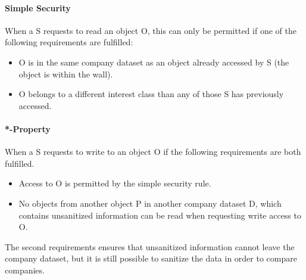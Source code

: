 \paragraph{Simple Security}

When a \principal{} S requests to read an object O, this can only be permitted if one of the following requirements are fulfilled:

\begin{itemize}
\item O is in the same company dataset as an object already accessed by S (the object is within the wall).
\item O belongs to a different interest class than any of those S has previously accessed.
\end{itemize}

\paragraph{*-Property}

When a \principal{} S requests to write to an object O if the following requirements are both fulfilled.

\begin{itemize}
\item Access to O is permitted by the simple security rule.
\item No objects from another object P in another company dataset D, which contains unsanitized information can be read when requesting write access to O.
\end{itemize}

The second requirements ensures that unsanitized information cannot leave the company dataset, but it is still possible to sanitize the data in order to compare companies.
